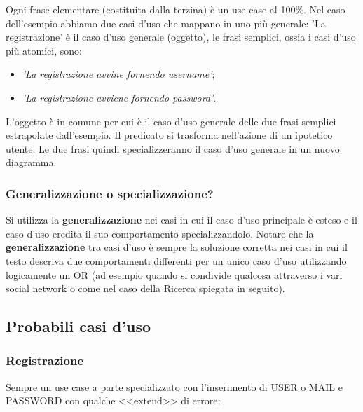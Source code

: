 \documentclass[a4paper,11pt]{article}
\begin{document}
			
		Ogni frase elementare (costituita dalla terzina) è un use case al 100\%. Nel caso dell'esempio abbiamo due casi d'uso che mappano in uno più generale: 'La registrazione' è il caso d'uso generale (oggetto), le frasi semplici, ossia i casi d'uso più atomici, sono:
		\begin{itemize}
			\item \textit{'La registrazione avvine fornendo username'};
			\item \textit{'La registrazione avviene fornendo password'}.
		\end{itemize}
				
		L'oggetto è in comune per cui è il caso d'uso generale delle due frasi semplici estrapolate dall'esempio. Il predicato si trasforma nell'azione di un ipotetico utente. Le due frasi quindi specializzeranno il caso d'uso generale in un nuovo diagramma.
		
		\subsubsection{Generalizzazione o specializzazione?}
		Si utilizza la \textbf{generalizzazione} nei casi in cui il caso d'uso principale è esteso e il caso d'uso eredita il suo comportamento specializzandolo. Notare che la \textbf{generalizzazione} tra casi d'uso è sempre la soluzione corretta nei casi in cui il testo descriva due comportamenti differenti per un unico caso d'uso utilizzando logicamente un OR (ad esempio quando si condivide qualcosa attraverso i vari social network o come nel caso della Ricerca spiegata in seguito).


\newpage
	\subsection{Probabili casi d'uso}
	
	
	\subsubsection{Registrazione} 
	Sempre un use case a parte specializzato con l'inserimento di USER o MAIL e PASSWORD con qualche <<extend>> di errore;
	
\end{document}
